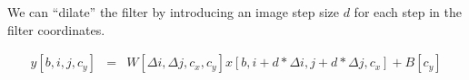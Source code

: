 {

We can ``dilate'' the filter by introducing an image step size $d$ for each step in the filter coordinates.

\vfill
\begin{eqnarray*}
  y[b,i,j,c_y] & = &  W[\Delta i, \Delta j, c_x, c_y] x[b,i + d*\Delta i, j + d*\Delta j, c_x] + B[c_y]
\end{eqnarray*}





}

